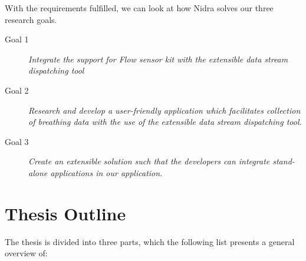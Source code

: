 With the requirements fulfilled, we can look at how Nidra solves our three research goals.

\begin{description}
    \item[Goal 1] \textit{Integrate the support for Flow sensor kit with the extensible data stream dispatching tool}
    \item[Goal 2] \textit{Research and develop a user-friendly application which facilitates collection of breathing data with the use of the extensible data stream dispatching tool.}
    \item[Goal 3] \textit{Create an extensible solution such that the developers can integrate stand-alone applications in our application.}
\end{description}



\section{Thesis Outline}
The thesis is divided into three parts, which the following list presents a general overview of:

